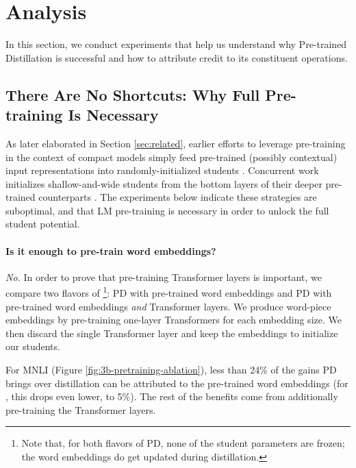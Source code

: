 \section{Analysis}
\label{sec:exp}

In this section, we conduct experiments that help us understand why Pre-trained Distillation is successful and how to attribute credit to its constituent operations.

\subsection{There Are No Shortcuts: Why Full Pre-training Is Necessary}

As later elaborated in Section \ref{sec:related}, earlier efforts to leverage pre-training in the context of compact models simply feed pre-trained (possibly contextual) input representations into randomly-initialized students \citep{distillation-reading-comprehension, distillation-classification,tang2019distilling}. Concurrent work initializes shallow-and-wide students from the bottom layers of their deeper pre-trained counterparts \citep{truncated-pretraining, patient_kd}. The experiments below indicate these strategies are suboptimal, and that LM pre-training is necessary in order to unlock the full student potential. 

\paragraph{Is it enough to pre-train word embeddings?}
\emph{No.} In order to prove that pre-training Transformer layers is important, we compare two flavors of \recipename\footnote{Note that, for both flavors of PD, none of the student parameters are frozen; the word embeddings do get updated during distillation.}:
PD with pre-trained word embeddings and PD with pre-trained word embeddings \emph{and} Transformer layers.  We produce word-piece embeddings by pre-training one-layer Transformers for each embedding size. We then discard the single Transformer layer and keep the  embeddings to initialize our students.

For MNLI (Figure \ref{fig:3b-pretraining-ablation}), less than 24\% of the gains PD brings over distillation can be attributed to the pre-trained word embeddings (for \berttiny, this drops even lower, to 5\%). The rest of the benefits come from additionally pre-training the Transformer layers.

